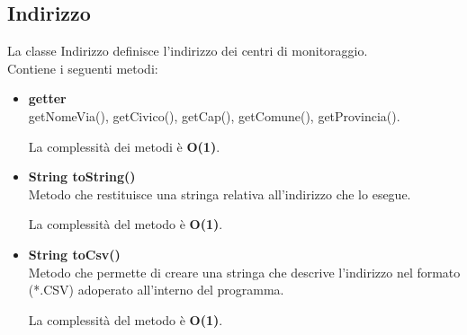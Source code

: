 \documentclass[a4paper, 12pt]{scrreprt}
\begin{document}
			\subsection{Indirizzo}
			La classe Indirizzo definisce l'indirizzo dei centri di monitoraggio.
			\\Contiene i seguenti metodi:\\
			\begin{itemize}
				\item \textbf{getter}
				\\ getNomeVia(), getCivico(), getCap(), getComune(), getProvincia().
				
				La complessit\`a dei metodi è \textbf{O(1)}.
				
				\item \textbf{String toString()}
				\\Metodo che restituisce una stringa relativa all'indirizzo che lo esegue.
				
				La complessit\`a del metodo è \textbf{O(1)}.
				
				\item \textbf{String toCsv()}
				\\Metodo che permette di creare una stringa che descrive l'indirizzo nel formato (*.CSV) adoperato all'interno del programma.
				
				La complessit\`a del metodo è \textbf{O(1)}.
				
			\end{itemize}
\end{document}
